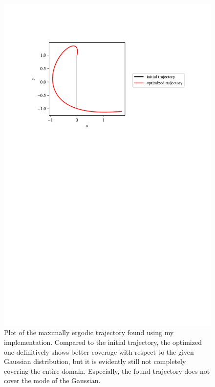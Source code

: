 \begin{figure}[h]
    \centering
    \includegraphics[width=\textwidth]{hw5_1.pdf}
    \vspace{-5mm}
    \caption{Plot of the maximally ergodic trajectory found using my implementation. 
    Compared to the initial trajectory, the optimized one definitively shows better coverage with respect to the given Gaussian distribution, 
    but it is evidently still not completely covering the entire domain. Especially, the found trajectory does not cover the mode of the Gaussian.}
    \label{fig:ergodic}
\end{figure}
